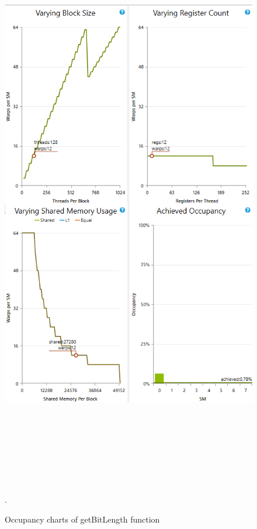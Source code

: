 \documentclass[oneside,openright,12pt,final,en]{mgr}
\begin{document}
\begin{figure}[H]
	\centering
	\includegraphics[width=\textwidth, height=26cm,keepaspectratio]{bitlength_occupancy_charts}.
	\caption{Occupancy charts of getBitLength function}
	\label{fig:bitlength_occupancy_charts}
\end{figure}
\end{document}

